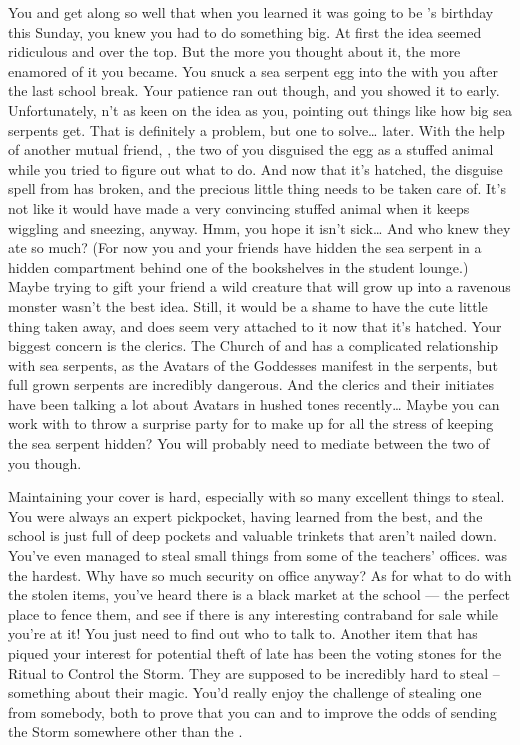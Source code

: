 \documentclass[char]{GL2020}
\begin{document}
You and \cDisney{} get along so well that when you learned it was going to be \cDisney{}'s birthday this Sunday, you knew you had to do something big. At first the idea seemed ridiculous and over the top. But the more you thought about it, the more enamored of it you became. You snuck a sea serpent egg into the \pSc{} with you after the last school break. Your patience ran out though, and you showed it to \cDisney{} early. Unfortunately, \cDisney{\they} \cDisney{\were}n't as keen on the idea as you, pointing out things like how big sea serpents get. That is definitely a problem, but one to solve\ldots{} later. With the help of another mutual friend, \cAdopted{\full}, the two of you disguised the egg as a stuffed animal while you tried to figure out what to do. And now that it's hatched, the disguise spell from \cAdopted{} has broken, and the precious little thing needs to be taken care of.  It's not like it would have made a very convincing stuffed animal when it keeps wiggling and sneezing, anyway. Hmm, you hope it isn't sick\ldots{} And who knew they ate so much? (For now you and your friends have hidden the sea serpent in a hidden compartment behind one of the bookshelves in the student lounge.) Maybe trying to gift your friend a wild creature that will grow up into a ravenous monster wasn't the best idea. Still, it would be a shame to have the cute little thing taken away, and \cDisney{} does seem very attached to it now that it's hatched. Your biggest concern is the clerics. The Church of \cEbb{} and \cFlow{} has a complicated relationship with sea serpents, as the Avatars of the Goddesses manifest in the serpents, but full grown serpents are incredibly dangerous. And the clerics and their initiates have been talking a lot about Avatars in hushed tones recently\ldots{} Maybe you can work with \cTechStar{} to throw a surprise party for \cDisney{} to make up for all the stress of keeping the sea serpent hidden? You will probably need \cAdopted{} to mediate between the two of you though.

Maintaining your cover is hard, especially with so many excellent things to steal. You were always an expert pickpocket, having learned from the best, and the school is just full of deep pockets and valuable trinkets that aren't nailed down. You've even managed to steal small things from some of the teachers' offices. \cChupInventor{\full} was the hardest. Why \cChupInventor{\does} \cChupInventor{\they} have so much security on \cChupInventor{\their} office anyway? As for what to do with the stolen items, you've heard there is a black market at the school — the perfect place to fence them, and see if there is any interesting contraband for sale while you're at it! You just need to find out who to talk to. Another item that has piqued your interest for potential theft of late has been the voting stones for the Ritual to Control the Storm. They are supposed to be incredibly hard to steal – something about their magic. You'd really enjoy the challenge of stealing one from somebody, both to prove that you can and to improve the odds of sending the Storm somewhere other than the \pShip{}.
\end{document}
